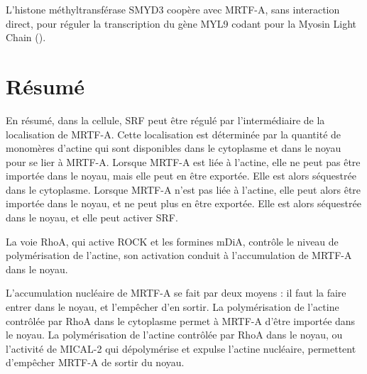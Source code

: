 L'histone méthyltransférase SMYD3 coopère avec MRTF-A, sans interaction direct, pour réguler la transcription du gène MYL9 codant pour la Myosin Light Chain (\cite{luo_histone_2014}). 

\section{Résumé}
En résumé, dans la cellule, SRF peut être régulé par l'intermédiaire de la localisation de MRTF-A. Cette localisation est déterminée par la quantité de monomères d'actine qui sont disponibles dans le cytoplasme et dans le noyau pour se lier à MRTF-A. Lorsque MRTF-A est liée à l'actine, elle ne peut pas être importée dans le noyau, mais elle peut en être exportée. Elle est alors séquestrée dans le cytoplasme. Lorsque MRTF-A n'est pas liée à l'actine, elle peut alors être importée dans le noyau, et ne peut plus en être exportée. Elle est alors séquestrée dans le noyau, et elle peut activer SRF. 

La voie RhoA, qui active ROCK et les formines mDiA, contrôle le niveau de polymérisation de l'actine, son activation conduit à l'accumulation de MRTF-A dans le noyau. 

L'accumulation nucléaire de MRTF-A se fait par deux moyens : il faut la faire entrer dans le noyau, et l'empêcher d'en sortir. La polymérisation de l'actine contrôlée par RhoA dans le cytoplasme permet à MRTF-A d'être importée dans le noyau. La polymérisation de l'actine contrôlée par RhoA dans le noyau, ou l'activité de MICAL-2 qui dépolymérise et expulse l'actine nucléaire, permettent d'empêcher MRTF-A de sortir du noyau. 



%